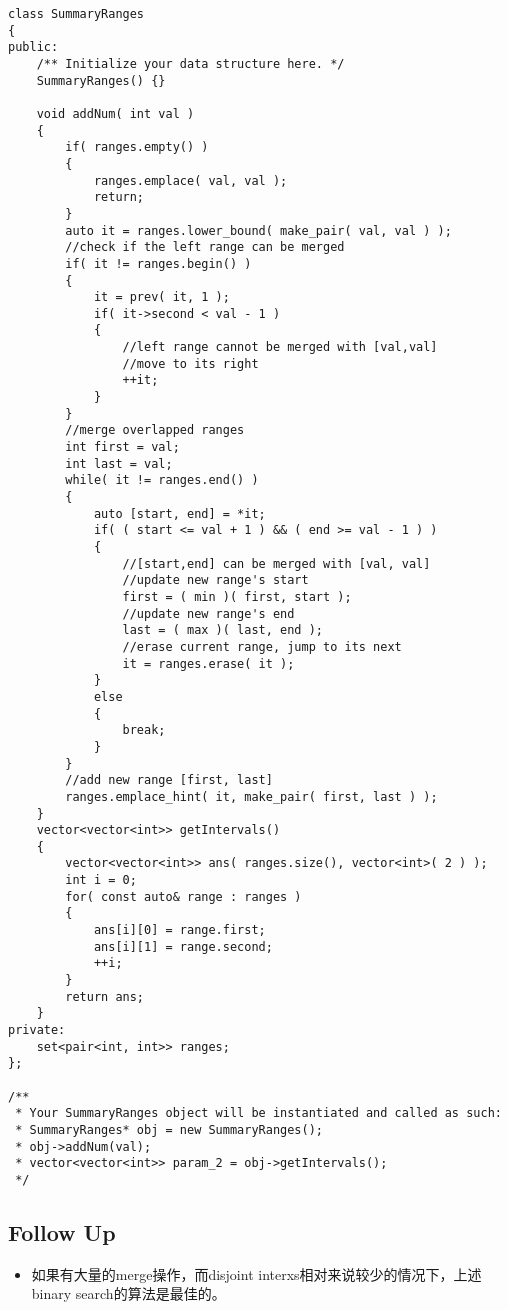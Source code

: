\setcounter{lstlisting}{0}
\begin{lstlisting}[style=customc, caption={Binary Search}]
class SummaryRanges
{
public:
    /** Initialize your data structure here. */
    SummaryRanges() {}

    void addNum( int val )
    {
        if( ranges.empty() )
        {
            ranges.emplace( val, val );
            return;
        }
        auto it = ranges.lower_bound( make_pair( val, val ) );
        //check if the left range can be merged
        if( it != ranges.begin() )
        {
            it = prev( it, 1 );
            if( it->second < val - 1 )
            {
                //left range cannot be merged with [val,val]
                //move to its right
                ++it;
            }
        }
        //merge overlapped ranges
        int first = val;
        int last = val;
        while( it != ranges.end() )
        {
            auto [start, end] = *it;
            if( ( start <= val + 1 ) && ( end >= val - 1 ) )
            {
                //[start,end] can be merged with [val, val]
                //update new range's start
                first = ( min )( first, start );
                //update new range's end
                last = ( max )( last, end );
                //erase current range, jump to its next
                it = ranges.erase( it );
            }
            else
            {
                break;
            }
        }
        //add new range [first, last]
        ranges.emplace_hint( it, make_pair( first, last ) );
    }
    vector<vector<int>> getIntervals()
    {
        vector<vector<int>> ans( ranges.size(), vector<int>( 2 ) );
        int i = 0;
        for( const auto& range : ranges )
        {
            ans[i][0] = range.first;
            ans[i][1] = range.second;
            ++i;
        }
        return ans;
    }
private:
    set<pair<int, int>> ranges;
};

/**
 * Your SummaryRanges object will be instantiated and called as such:
 * SummaryRanges* obj = new SummaryRanges();
 * obj->addNum(val);
 * vector<vector<int>> param_2 = obj->getIntervals();
 */
\end{lstlisting}

\subsection{Follow Up}
\begin{itemize}
\item 如果有大量的merge操作，而disjoint interxs相对来说较少的情况下，上述binary search的算法是最佳的。
\end{itemize}